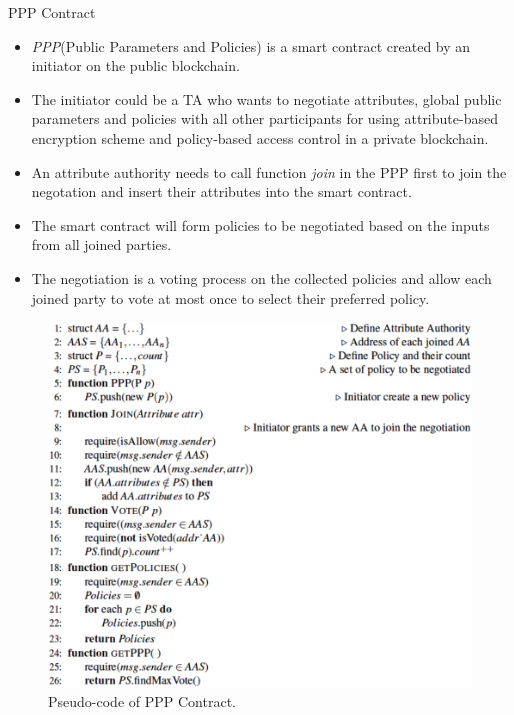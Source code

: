 \documentclass[11pt]{beamer}
\begin{document}
\begin{frame}[allowframebreaks]{PPP Contract}
\begin{itemize}
\item \textit{PPP}(Public Parameters and Policies) is a smart contract created by an initiator on the public blockchain.
\item The initiator could be a TA who wants to negotiate attributes, global public parameters and policies with all other participants for using attribute-based encryption scheme and policy-based access control in a private blockchain.
\item An attribute authority needs to call function \textit{join} in the PPP first to join the negotation and insert their attributes into the smart contract.
\item The smart contract will form policies to be negotiated based on the inputs from all joined parties.
\item The negotiation is a voting process on the collected policies and allow each joined party to vote at most once to select their preferred policy.
\end{itemize}

\begin{figure}
\includegraphics[scale=0.25]{pppcontract.png}
\caption{Pseudo-code of PPP Contract.}
\label{fig:pppcontract}
\end{figure}

\end{frame}
\end{document}
